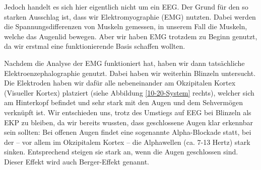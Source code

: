 \documentclass[11pt]{scrartcl}
\begin{document}
	\begin{figure}[h!]
	\end{figure}

	Jedoch handelt es sich hier eigentlich nicht um ein EEG. Der Grund für den so starken Ausschlag ist, dass wir Elektromyographie (EMG) nutzten. Dabei werden die Spannungsdifferenzen von Muskeln gemessen, in unserem Fall die Muskeln, welche das Augenlid bewegen. \cite{wiki:EMG}
	Aber wir haben EMG trotzdem zu Beginn genutzt, da wir erstmal eine funktionierende Basis schaffen wollten.

	Nachdem die Analyse der EMG funktioniert hat, haben wir dann tatsächliche Elektroenzephalographie genutzt. Dabei haben wir weiterhin Blinzeln untersucht. Die Elektroden haben wir dafür alle nebeneinander am Okzipitalen Kortex (Visueller Kortex) platziert (siehe Abbildung \ref{10-20-System} rechts), welcher sich am Hinterkopf befindet und sehr stark mit den Augen und dem Sehvermögen verknüpft ist. \cite{Birbaumer2010} 
	Wir entschieden uns, trotz des Umstiegs auf EEG bei Blinzeln als EKP zu bleiben, da wir bereits wussten, dass geschlossene Augen klar erkennbar sein sollten: Bei offenen Augen findet eine sogenannte Alpha-Blockade statt, bei der -- vor allem im Okzipitalem Kortex -- die Alphawellen (ca. 7-13 Hertz) stark sinken. Entsprechend steigen sie stark an, wenn die Augen geschlossen sind. Dieser Effekt wird auch Berger-Effekt genannt. \cite{Springer:Berger} \cite{Praktikum} \cite{wiki:Berger-Effekt}

\end{document}
